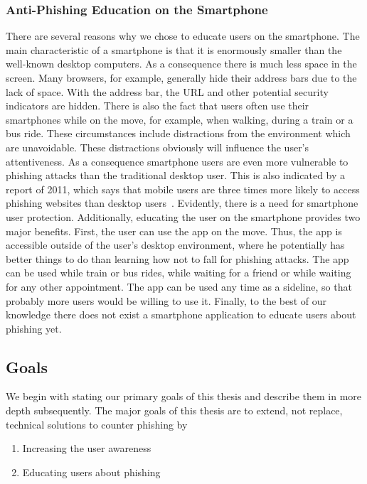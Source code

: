 \subsubsection{Anti-Phishing Education on the Smartphone}
There are several reasons why we chose to educate users on the smartphone. The main characteristic of a smartphone is that it is enormously smaller than the well-known desktop computers. As a consequence there is much less space in the screen. Many browsers, for example, generally hide their address bars due to the lack of space. With the address bar, the URL and other potential security indicators are hidden. There is also the fact that users often use their smartphones while on the move, for example, when walking, during a train or a bus ride. These circumstances include distractions from the environment which are unavoidable. These distractions obviously will influence the user's attentiveness. As a consequence smartphone users are even more vulnerable to phishing attacks than the traditional desktop user. This is also indicated by a report of 2011, which says that mobile users are three times more likely to access phishing websites than desktop users~\cite{trusteer2011}. Evidently, there is a need for smartphone user protection. Additionally, educating the user on the smartphone provides two major benefits. First, the user can use the app on the move. Thus, the app is accessible outside of the user's desktop environment, where he potentially has better things to do than learning how not to fall for phishing attacks. The app can be used while train or bus rides, while waiting for a friend or while waiting for any other appointment. The app can be used any time as a sideline, so that probably more users would be willing to use it. Finally, to the best of our knowledge there does not exist a smartphone application to educate users about phishing yet. 

\subsection{Goals}
\label{s:goals}
We begin with stating our primary goals of this thesis and describe them in more depth subsequently. The major goals of this thesis are to extend, not replace, technical solutions to counter phishing by
\begin{enumerate}
	\item Increasing the user awareness
	\item Educating users about phishing 
\end{enumerate}


